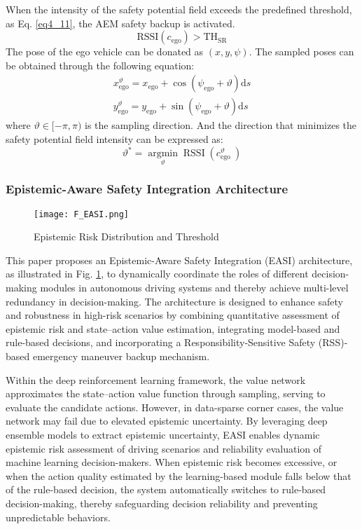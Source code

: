 \documentclass[preprint,12pt,authoryear]{elsarticle}
\begin{document}
When the intensity of the safety potential field exceeds the predefined threshold, as Eq. \ref{eq4_11}, the AEM safety backup is activated.
\begin{equation}
\text{RSSI}(c_\text{ego})>\text{TH}_\text{SR}
\label{eq4_11}
\end{equation}
The pose of the ego vehicle can be donated as $(x, y, \psi)$. The sampled poses can be obtained through the following equation:
\begin{equation}
\begin{array}{l}
x_{\mathrm{ego}}^{\vartheta}=x_{\mathrm{ego}}+\cos \left(\psi_{\mathrm{ego}}+\vartheta\right) \mathrm{d} s \\
y_{\mathrm{ego}}^{\vartheta}=y_{\mathrm{ego}}+\sin \left(\psi_{\mathrm{ego}}+\vartheta\right) \mathrm{d} s
\end{array}
\label{eq4_12}
\end{equation}
where $\vartheta \in [-\pi, \pi)$ is the sampling direction. And the direction that minimizes the safety potential field intensity can be expressed as:
\begin{equation}
\vartheta^*=\underset{\vartheta}{\operatorname{argmin}} \operatorname{RSSI}\left(c_{\text {ego }}^{\vartheta}\right)
\label{eq4_13}
\end{equation}


\subsubsection{Epistemic-Aware Safety Integration Architecture}

\begin{figure}[hbtp]
\centering
\texttt{[image: F\_EASI.png]}
\caption{Epistemic Risk Distribution and Threshold}
\label{F_EASI}
\end{figure}

This paper proposes an Epistemic-Aware Safety Integration (EASI) architecture, as illustrated in Fig. \ref{F_EASI}, to dynamically coordinate the roles of different decision-making modules in autonomous driving systems and thereby achieve multi-level redundancy in decision-making. The architecture is designed to enhance safety and robustness in high-risk scenarios by combining quantitative assessment of epistemic risk and state–action value estimation, integrating model-based and rule-based decisions, and incorporating a Responsibility-Sensitive Safety (RSS)-based emergency maneuver backup mechanism.

Within the deep reinforcement learning framework, the value network approximates the state–action value function through sampling, serving to evaluate the candidate actions. However, in data-sparse corner cases, the value network may fail due to elevated epistemic uncertainty. By leveraging deep ensemble models to extract epistemic uncertainty, EASI enables dynamic epistemic risk assessment of driving scenarios and reliability evaluation of machine learning decision-makers. When epistemic risk becomes excessive, or when the action quality estimated by the learning-based module falls below that of the rule-based decision, the system automatically switches to rule-based decision-making, thereby safeguarding decision reliability and preventing unpredictable behaviors.
\end{document}
